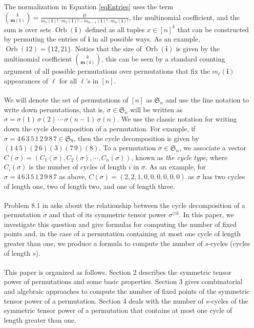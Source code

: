 \documentclass[12pt]{amsart}
\newcommand{\Orb}{\operatorname{Orb}}
\begin{document}
The normalization in Equation \ref{eqEntries} uses the term $\binom{k}{\textbf{m}(\textbf{i})} = \frac{k!}{m_{1}(\textbf{i})!\cdot m_{2}(\textbf{i})! \, \cdots \,  m_{n-1}(\textbf{i})!\cdot m_{n}(\textbf{i})!}$, the multinomial coefficient, and the sum is over sets $\Orb (\textbf{i})$ defined as all tuples  $x \in [n]^k$ that can be constructed by permuting the entries of $\textbf{i}$ in all possible ways. As an example, $\Orb (12) = \{12,21\}$. Notice that the size of $\Orb (\textbf{i}) $ is given by the multinomial coefficient $\binom{k}{\textbf{m}(\textbf{i})}$, this can be seen by a standard counting argument of all possible permutations over permutations that fix the $m_{\ell}(\textbf{i})$ appearances of $\ell$ for all $\ell$'s in $[n]$.\\\\
We will denote the set of permutations of $[n]$ as $\mathfrak{S}_n$ and use the line notation to write down permutations, that is, $\sigma \in \mathfrak{S}_n$ will be written as $\sigma = \sigma(1)\, \sigma(2)\, \cdots \, \sigma (n-1)\, \sigma (n)$. We use the classic notation for writing down the cycle decomposition of a permutation. For example, if $\sigma = 4\,6\,3\,5\,1\,2\,9\,8\,7 \in \mathfrak{S}_9$, then the cycle decomposition is given by $(1\,4\,5)(2\, 6)(3)(7\, 9)(8)$. To a permutation $\sigma \in \mathfrak{S}_n$, we associate a vector $C(\sigma) = (C_1(\sigma),C_2(\sigma),\cdots , C_n(\sigma))$, known as \textit{the cycle type}, where $C_i(\sigma)$ is the number of cycles of length $i$ in $\sigma$. As an example, for $\sigma = 4\,6\,3\,5\,1\,2\,9\,8\,7$ as above, $C\left ( \sigma \right ) = (2,2,1,0,0,0,0,0,0)$ as $
\sigma$ has two cycles of length one, two of length two, and one of length three.\\\\
Problem 8.1 in \cite{AstaizaetAl2026} asks about the relationship between the cycle decomposition of a permutation $\sigma$ and that of its symmetric tensor power $\sigma ^{\odot k}$. In this paper, we investigate this question and give formulas for computing the number of fixed points and, in the case of a permutation containing at most one cycle of length greater than one, we produce a formula to compute the number of $s$-cycles (cycles of length $s$).\\\\
This paper is organized as follows. Section 2 describes the symmetric tensor power of permutations and some basic properties. Section 3 gives combinatorial and algebraic approaches to compute the number of fixed points of the symmetric tensor power of a permutation. Section 4 deals with the number of $s$-cycles of the symmetric tensor power of a permutation that contains at most one cycle of length greater than one.
\end{document}
